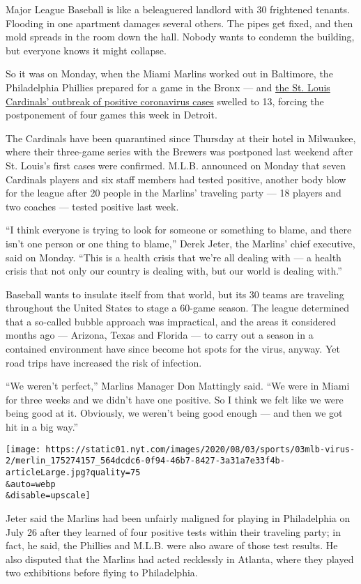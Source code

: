 Major League Baseball is like a beleaguered landlord with 30 frightened
tenants. Flooding in one apartment damages several others. The pipes get
fixed, and then mold spreads in the room down the hall. Nobody wants to
condemn the building, but everyone knows it might collapse.

So it was on Monday, when the Miami Marlins worked out in Baltimore, the
Philadelphia Phillies prepared for a game in the Bronx --- and
\href{https://www.nytimes.com/2020/08/01/sports/baseball/coronavirus-cardinals.html}{the
St. Louis Cardinals' outbreak of positive coronavirus cases} swelled to
13, forcing the postponement of four games this week in Detroit.

The Cardinals have been quarantined since Thursday at their hotel in
Milwaukee, where their three-game series with the Brewers was postponed
last weekend after St. Louis's first cases were confirmed. M.L.B.
announced on Monday that seven Cardinals players and six staff members
had tested positive, another body blow for the league after 20 people in
the Marlins' traveling party --- 18 players and two coaches --- tested
positive last week.

``I think everyone is trying to look for someone or something to blame,
and there isn't one person or one thing to blame,'' Derek Jeter, the
Marlins' chief executive, said on Monday. ``This is a health crisis that
we're all dealing with --- a health crisis that not only our country is
dealing with, but our world is dealing with.''

Baseball wants to insulate itself from that world, but its 30 teams are
traveling throughout the United States to stage a 60-game season. The
league determined that a so-called bubble approach was impractical, and
the areas it considered months ago --- Arizona, Texas and Florida --- to
carry out a season in a contained environment have since become hot
spots for the virus, anyway. Yet road trips have increased the risk of
infection.

``We weren't perfect,'' Marlins Manager Don Mattingly said. ``We were in
Miami for three weeks and we didn't have one positive. So I think we
felt like we were being good at it. Obviously, we weren't being good
enough --- and then we got hit in a big way.''

\texttt{[image: https://static01.nyt.com/images/2020/08/03/sports/03mlb-virus-2/merlin\_175274157\_564dcdc6-0f94-46b7-8427-3a31a7e33f4b-articleLarge.jpg?quality=75\\\&auto=webp\\\&disable=upscale]}

Jeter said the Marlins had been unfairly maligned for playing in
Philadelphia on July 26 after they learned of four positive tests within
their traveling party; in fact, he said, the Phillies and M.L.B. were
also aware of those test results. He also disputed that the Marlins had
acted recklessly in Atlanta, where they played two exhibitions before
flying to Philadelphia.

